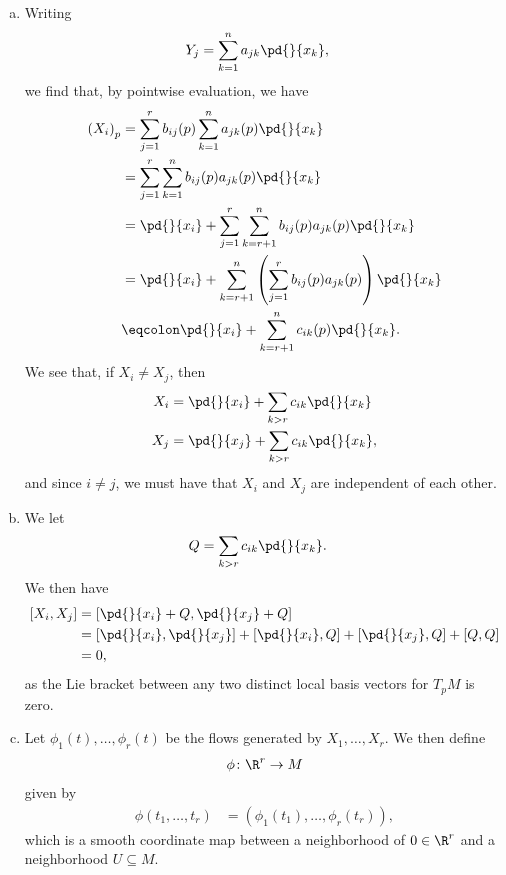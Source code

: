 \documentclass[10pt]{mypackage}
\begin{document}
\begin{solution}
\begin{enumerate}[(a)]
    \item Writing
      \begin{align*}
        Y_{j} &= \sum_{k=1}^{n}a_{jk} \pd{}{x_k},
      \end{align*}
      we find that, by pointwise evaluation, we have
      \begin{align*}
        \left( X_i \right)_p &= \sum_{j=1}^{r} b_{ij}(p) \sum_{k=1}^{n} a_{jk}(p) \pd{}{x_k}\\
            &= \sum_{j=1}^{r} \sum_{k=1}^{n} b_{ij}(p)a_{jk}(p) \pd{}{x_k}\\
            &= \pd{}{x_i} + \sum_{j=1}^{r} \sum_{k=r+1}^{n} b_{ij}(p)a_{jk}(p) \pd{}{x_k}\\
            &= \pd{}{x_i} + \sum_{k=r+1}^{n} \left( \sum_{j=1}^{r} b_{ij}(p)a_{jk}(p) \right) \pd{}{x_k}\\
            &\eqcolon \pd{}{x_i} + \sum_{k=r+1}^{n} c_{ik}(p) \pd{}{x_k}.
      \end{align*}
      We see that, if $X_i\neq X_j$, then
      \begin{align*}
        X_i &= \pd{}{x_i} + \sum_{k > r} c_{ik} \pd{}{x_k}\\
        X_j &= \pd{}{x_j} + \sum_{k > r} c_{ik} \pd{}{x_k},
      \end{align*}
      and since $i \neq j$, we must have that $X_i$ and $X_j$ are independent of each other.
    \item We let
      \begin{align*}
        Q &= \sum_{k > r} c_{ik}\pd{}{x_k}.
      \end{align*}
      We then have
      \begin{align*}
        \left[ X_i,X_j \right] &= \left[ \pd{}{x_i} + Q, \pd{}{x_j} + Q \right]\\
                               &= \left[ \pd{}{x_i},\pd{}{x_j} \right] + \left[ \pd{}{x_i},Q \right] + \left[ \pd{}{x_j},Q \right] + \left[ Q,Q \right]\\
                               &= 0,
      \end{align*}
      as the Lie bracket between any two distinct local basis vectors for $T_pM$ is zero.
    \item Let $\phi_1(t),\dots,\phi_r(t)$ be the flows generated by $X_1,\dots,X_r$. We then define
      \begin{align*}
        \phi\colon \R^{r}\rightarrow M
      \end{align*}
      given by
      \begin{align*}
        \phi\left( t_1,\dots,t_r \right) &= \left( \phi_1\left( t_1 \right),\dots,\phi_r\left( t_r \right) \right),
      \end{align*}
      which is a smooth coordinate map between a neighborhood of $0\in \R^{r}$ and a neighborhood $U\subseteq M$.
  \end{enumerate}
\end{solution}
\end{document}
